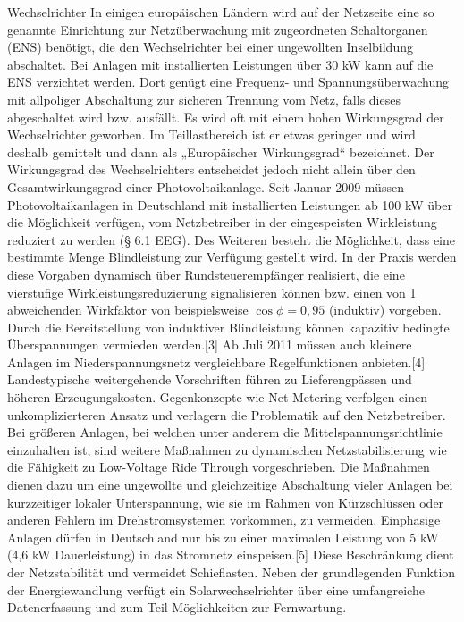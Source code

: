 Wechselrichter
In einigen europäischen Ländern wird auf der Netzseite eine so genannte Einrichtung zur Netzüberwachung mit zugeordneten Schaltorganen (ENS) benötigt, die den Wechselrichter bei einer ungewollten Inselbildung abschaltet. Bei Anlagen mit installierten Leistungen über 30 \si{kW} kann auf die ENS verzichtet werden. Dort genügt eine Frequenz- und Spannungsüberwachung mit allpoliger Abschaltung zur sicheren Trennung vom Netz, falls dieses abgeschaltet wird bzw. ausfällt. 
Es wird oft mit einem hohen Wirkungsgrad der Wechselrichter geworben. Im Teillastbereich ist er etwas geringer und wird deshalb gemittelt und dann als „Europäischer Wirkungsgrad“ bezeichnet. Der Wirkungsgrad des Wechselrichters entscheidet jedoch nicht allein über den Gesamtwirkungsgrad einer Photovoltaikanlage. 
Seit Januar 2009 müssen Photovoltaikanlagen in Deutschland mit installierten Leistungen ab 100 \si{kW} über die Möglichkeit verfügen, vom Netzbetreiber in der eingespeisten Wirkleistung reduziert zu werden (§ 6.1 EEG). Des Weiteren besteht die Möglichkeit, dass eine bestimmte Menge Blindleistung zur Verfügung gestellt wird. In der Praxis werden diese Vorgaben dynamisch über Rundsteuerempfänger realisiert, die eine vierstufige Wirkleistungsreduzierung signalisieren können bzw. einen von 1 abweichenden Wirkfaktor von beispielsweise $\cos \phi = 0,95$ (induktiv) vorgeben. Durch die Bereitstellung von induktiver Blindleistung können kapazitiv bedingte Überspannungen vermieden werden.[3] 
Ab Juli 2011 müssen auch kleinere Anlagen im Niederspannungsnetz vergleichbare Regelfunktionen anbieten.[4] Landestypische weitergehende Vorschriften führen zu Lieferengpässen und höheren Erzeugungskosten. Gegenkonzepte wie Net Metering verfolgen einen unkomplizierteren Ansatz und verlagern die Problematik auf den Netzbetreiber. 
Bei größeren Anlagen, bei welchen unter anderem die Mittelspannungsrichtlinie einzuhalten ist, sind weitere Maßnahmen zu dynamischen Netzstabilisierung wie die Fähigkeit zu Low-Voltage Ride Through vorgeschrieben. Die Maßnahmen dienen dazu um eine ungewollte und gleichzeitige Abschaltung vieler Anlagen bei kurzzeitiger lokaler Unterspannung, wie sie im Rahmen von Kürzschlüssen oder anderen Fehlern im Drehstromsystemen vorkommen, zu vermeiden. 
Einphasige Anlagen dürfen in Deutschland nur bis zu einer maximalen Leistung von 5 \si{kW} (4,6 \si{kW} Dauerleistung) in das Stromnetz einspeisen.[5] Diese Beschränkung dient der Netzstabilität und vermeidet Schieflasten. Neben der grundlegenden Funktion der Energiewandlung verfügt ein Solarwechselrichter über eine umfangreiche Datenerfassung und zum Teil Möglichkeiten zur Fernwartung. 



